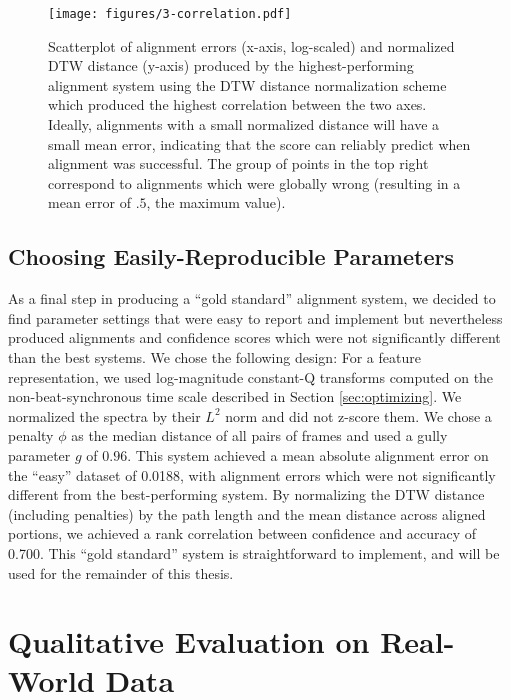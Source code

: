 \begin{figure}
  \centering
  \texttt{[image: figures/3-correlation.pdf]}
  \caption[Alignment errors and normalized DTW distances for the best-performing system]{Scatterplot of alignment errors (x-axis, log-scaled) and normalized DTW distance (y-axis) produced by the highest-performing alignment system using the DTW distance normalization scheme which produced the highest correlation between the two axes.
Ideally, alignments with a small normalized distance will have a small mean error, indicating that the score can reliably predict when alignment was successful.
The group of points in the top right correspond to alignments which were globally wrong (resulting in a mean error of $.5$, the maximum value).}
  \label{fig:correlation}
\end{figure}

\subsection{Choosing Easily-Reproducible Parameters}
\label{sec:goldstandard}

As a final step in producing a ``gold standard'' alignment system, we decided to find parameter settings that were easy to report and implement but nevertheless produced alignments and confidence scores which were not significantly different than the best systems.
We chose the following design: For a feature representation, we used log-magnitude constant-Q transforms computed on the non-beat-synchronous time scale described in Section \ref{sec:optimizing}.
We normalized the spectra by their $L^2$ norm and did not z-score them.
We chose a penalty $\phi$ as the median distance of all pairs of frames and used a gully parameter $g$ of $0.96$.
This system achieved a mean absolute alignment error on the ``easy'' dataset of 0.0188, with alignment errors which were not significantly different from the best-performing system.
By normalizing the DTW distance (including penalties) by the path length and the mean distance across aligned portions, we achieved a rank correlation between confidence and accuracy of 0.700.
This ``gold standard'' system is straightforward to implement, and will be used for the remainder of this thesis.

\section{Qualitative Evaluation on Real-World Data}
\label{sec:qualitative}

